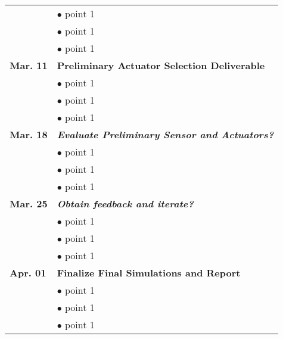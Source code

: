 \documentclass[12pt]{article}
\begin{document}
{\begin{tabular}{l | l}
 & $\bullet$ point 1\\
  & $\bullet$ point 1\\
   & $\bullet$ point 1\\
\textbf{Mar. 11} &\textbf{Preliminary Actuator Selection Deliverable}\\
 & $\bullet$ point 1\\
  & $\bullet$ point 1\\
   & $\bullet$ point 1\\
\textbf{Mar. 18} & \textbf{\textit{Evaluate Preliminary Sensor and Actuators?}}\\
 & $\bullet$ point 1\\
  & $\bullet$ point 1\\
   & $\bullet$ point 1\\
\textbf{Mar. 25} & \textbf{\textit{Obtain feedback and iterate?}}\\
 & $\bullet$ point 1\\
  & $\bullet$ point 1\\
   & $\bullet$ point 1\\
\textbf{Apr. 01} & \textbf{Finalize Final Simulations and Report}\\
 & $\bullet$ point 1\\
  & $\bullet$ point 1\\
   & $\bullet$ point 1\\


\end{tabular}
}
\end{document}
